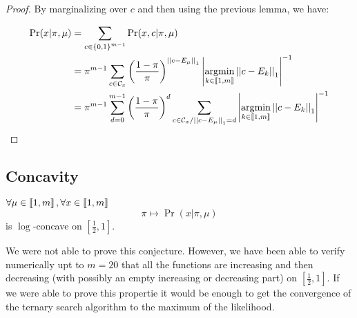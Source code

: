 \begin{proof}
    By marginalizing over $c$ and then using the previous lemma, we have:

\begin{align}
    \Pr(x | \pi, \mu)
    &= \sum_{c \in \left\{ 0, 1 \right\}^{m-1}} \Pr(x, c | \pi, \mu)\\
    &= \pi^{m-1} \sum_{c \in \mathcal{C}_x} \left(\frac{1 - \pi}{\pi}\right)^{\left|\left|c - E_{\mu}\right|\right|_1} \left|\operatorname*{argmin}_{k \in \left\llbracket1, m\right\rrbracket} \left|\left|c - E_k\right|\right|_1\right|^{-1}\\
    &= \pi^{m-1} \sum_{d = 0}^{m-1} \left(\frac{1 - \pi}{\pi}\right)^d \sum_{c \in \mathcal{C}_x / \left|\left|c - E_{\mu}\right|\right|_1 = d}  \left|\operatorname*{argmin}_{k \in \left\llbracket1, m\right\rrbracket} \left|\left|c - E_k\right|\right|_1\right|^{-1}
\end{align}
\end{proof}


\subsection{Concavity}

\begin{conjecture}
    \label{thm:log_likelihood_concave_appendix}
    $\forall \mu \in \left\llbracket1, m\right\rrbracket, \forall x \in \left\llbracket1, m\right\rrbracket$
    \[ \pi \mapsto \Pr(x | \pi, \mu) \]
    is $\log$-concave on $\left[\frac{1}{2}, 1\right]$.
\end{conjecture}

We were not able to prove this conjecture. However, we have been able to verify numerically upt to $m=20$ that all the functions are increasing and then decreasing (with possibly an empty increasing or decreasing part) on $\left[\frac{1}{2}, 1\right]$. If we were able to prove this propertie it would be enough to get the convergence of the ternary search algorithm to the maximum of the likelihood.

